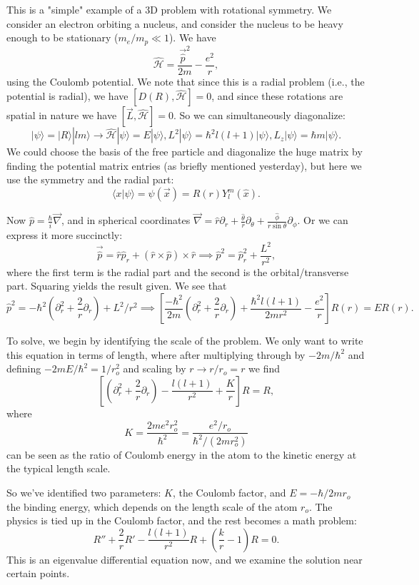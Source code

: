 \documentclass[fontsize=12pt]{scrartcl}
\newcommand{\ptl}{\partial}
\newcommand{\la}{\langle}
\newcommand{\ra}{\rangle}
\newcommand{\mom}{\hat{p}}
\newcommand{\momv}{\vec{\hat{p}}}
\newcommand{\Ham}{\hat{\mathcal{H}}}
\begin{document}
This is a "simple" example of a 3D problem with rotational symmetry. We consider an electron orbiting a nucleus, and consider the nucleus to be heavy enough to be stationary ($m_e/m_p\ll 1$). We have $$\Ham=\frac{\momv^2}{2m}-\frac{e^2}{r},$$ using the Coulomb potential. We note that since this is a radial problem (i.e., the potential is radial), we have $[D(R),\Ham]=0$, and since these rotations are spatial in nature we have $[\vec{L},\Ham]=0$. So we can simultaneously diagonalize: $$|\psi\ra = |R\ra |lm\ra \to \Ham|\psi\ra = E|\psi\ra, L^2|\psi\ra = \hbar^2l(l+1)|\psi\ra, L_z |\psi\ra = \hbar m|\psi\ra.$$ We could choose the basis of the free particle and diagonalize the huge matrix by finding the potential matrix entries (as briefly mentioned yesterday), but here we use the symmetry and the radial part: $$\la x|\psi\ra = \psi(\vec{x})=R(r)Y_l^m(\hat{x}).$$

Now $\mom=\frac{\hbar}{i}\vec{\nabla}$, and in spherical coordinates $\vec{\nabla}=\hat{r}\ptl_r+\frac{\hat{\theta}}{r}{\ptl_\theta}+\frac{\hat{\phi}}{r\sin\theta}\ptl_\phi.$ Or we can express it more succinctly: $$\momv = \hat{r}\mom_r+(\hat{r}\times \mom)\times \hat{r}\implies \mom^2 = \mom_r^2+\frac{L^2}{r^2},$$ where the first term is the radial part and the second is the orbital/transverse part. Squaring yields the result given. We see that $$\mom^2=-\hbar^2(\ptl_r^2+\frac{2}{r}\ptl_r)+L^2/r^2\implies\left[\frac{-\hbar^2}{2m}\left(\ptl_r^2+\frac{2}{r}\ptl_r\right)+\frac{\hbar^2l(l+1)}{2mr^2}-\frac{e^2}{r}\right]R(r)=ER(r).$$

To solve, we begin by identifying the scale of the problem. We only want to write this equation in terms of length, where after multiplying through by $-2m/\hbar^2$ and defining $-2mE/\hbar^2=1/r_o^2$ and scaling by $r\to r/r_o=r$ we find $$\left[\left(\ptl_r^2+\frac{2}{r}\ptl_r\right) - \frac{l(l+1)}{r^2}+\frac{K}{r}\right]R=R,$$ where $$K=\frac{2me^2r_o^2}{\hbar^2}=\frac{e^2/r_o}{\hbar^2/(2mr_o^2)}$$ can be seen as the ratio of Coulomb energy in the atom to the kinetic energy at the typical length scale.

So we've identified two parameters: $K$, the Coulomb factor, and $E=-\hbar/2mr_o$ the binding energy, which depends on the length scale of the atom $r_o$. The physics is tied up in the Coulomb factor, and the rest becomes a math problem: $$R'' + \frac{2}{r}R'-\frac{l(l+1)}{r^2}R+\left(\frac{k}{r}-1\right)R=0.$$ This is an eigenvalue differential equation now, and we examine the solution near certain points.
\end{document}
